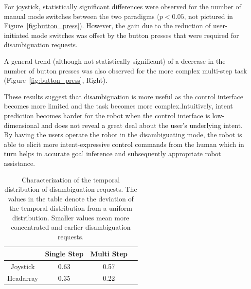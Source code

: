 \documentclass[natbib, twocolumn]{svjour3}          %
\begin{document}
For joystick, statistically significant differences were observed for the number of manual mode switches between the two paradigms ($p < 0.05$, not pictured in Figure~\ref{fig:button_press}). However, the gain due to the reduction of user-initiated mode switches was offset by the button presses that were required for disambiguation requests. 

A general trend (although not statistically significant) of a decrease in the number of button presses was also observed for the more complex multi-step task (Figure~\ref{fig:button_press}, Right). 

These results suggest that disambiguation is more useful as the control interface becomes more limited and the task becomes more complex.Intuitively, intent prediction becomes harder for the robot when the control interface is low-dimensional and does not reveal a great deal about the user's underlying intent. By having the users operate the robot in the disambiguating mode, the robot is able to elicit more intent-expressive control commands from the human which in turn helps in accurate goal inference and subsequently appropriate robot assistance. 
\begin{table}[t]
	\centering
	\caption{Characterization of the temporal distribution of disambiguation requests. The values in the table denote the deviation of the temporal distribution from a uniform distribution. Smaller values mean more concentrated and earlier disambiguation requests. } 
	\label{table:skewness}
	\begin{tabular}{|c|c|c|c|}
		\hline
		& Single Step & Multi Step \\
		\hline
		Joystick & 0.63 & 0.57 \\
		\hline
		Headarray & 0.35 & 0.22 \\
		\hline
	\end{tabular}
\end{table}
\end{document}

